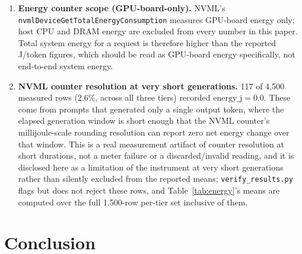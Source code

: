 \documentclass[conference]{IEEEtran}
\begin{document}
\begin{enumerate}
    measured evidence of this risk rather than a hypothetical one: the
    same deterministic workload --- confirmed token-for-token identical
    output via greedy decoding across all eight routing conditions
    (\S\ref{sec:rq3}) --- measured twice on the same GPU roughly four
    hours apart (2026-09-05, job 1505 at 15:04--17:43 and job 1507 at
    17:48--21:51) differed in per-request energy by up to 4.8$\times$
    (\texttt{static\_4bit}: 125.08 vs.\ 595.26 J/req) because of a
    co-tenant job's varying host-side load, not because the underlying
    computation differed. This is a stronger, evidence-backed version of
    the same threat rather than a new one, and is the direct motivation
    for the confirmed-quiet-node precondition (\S\ref{sec:rq2}) governing
    this paper's remaining routing runs. It does not, however, extend to
    RQ1: Session 1's three repeats already show this same node
    reproducible to within 7\% under quiet conditions (\S\ref{sec:rq1}),
    so the contention explains Session 4's runs specifically rather than
    undermining the measurement instrument or protocol in general.
  \item \textbf{Energy counter scope (GPU-board-only).} NVML's
    \texttt{nvmlDeviceGetTotalEnergyConsumption} measures GPU-board
    energy only; host CPU and DRAM energy are excluded from every
    number in this paper. Total system energy for a request is
    therefore higher than the reported J/token figures, which should be
    read as GPU-board energy specifically, not end-to-end system
    energy.
  \item \textbf{NVML counter resolution at very short generations.} 117
    of 4,500 measured rows (2.6\%, across all three tiers) recorded
    $\text{energy\_j} = 0.0$. These come from prompts that generated
    only a single output token, where the elapsed generation window is
    short enough that the NVML counter's millijoule-scale rounding
    resolution can report zero net energy change over that window. This
    is a real measurement artifact of counter resolution at short
    durations, not a meter failure or a discarded/invalid reading, and
    it is disclosed here as a limitation of the instrument at very
    short generations rather than silently excluded from the reported
    means; \texttt{verify\_results.py} flags but does not reject these
    rows, and Table~\ref{tab:energy}'s means are computed over the full
    1,500-row per-tier set inclusive of them.
\end{enumerate}

\section{Conclusion}
\label{sec:conclusion}
\end{document}
